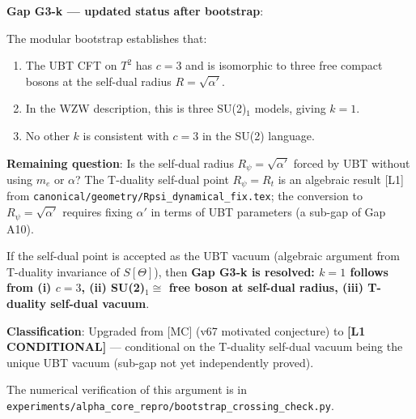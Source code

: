 \documentclass[12pt,a4paper]{article}
\theoremstyle{definition}
\theoremstyle{remark}
\begin{document}
\begin{gapbox}
\textbf{Gap G3-k — updated status after bootstrap}:

The modular bootstrap establishes that:
\begin{enumerate}
  \item The UBT CFT on $T^2$ has $c = 3$ and is isomorphic to three
        free compact bosons at the self-dual radius $R = \sqrt{\alpha'}$.
  \item In the WZW description, this is three SU(2)$_1$ models, giving $k = 1$.
  \item No other $k$ is consistent with $c = 3$ in the SU(2) language.
\end{enumerate}

\textbf{Remaining question}: Is the self-dual radius $R_\psi = \sqrt{\alpha'}$
forced by UBT without using $m_e$ or $\alpha$?  The T-duality self-dual point
$R_\psi = R_t$ is an algebraic result [L1] from
\texttt{canonical/geometry/Rpsi\_dynamical\_fix.tex}; the conversion to
$R_\psi = \sqrt{\alpha'}$ requires fixing $\alpha'$ in terms of UBT parameters
(a sub-gap of Gap A10).

If the self-dual point is accepted as the UBT vacuum (algebraic argument from
T-duality invariance of $S[\Theta]$), then \textbf{Gap G3-k is resolved:
$k = 1$ follows from (i) $c = 3$, (ii) SU(2)$_1 \cong$ free boson at self-dual
radius, (iii) T-duality self-dual vacuum}.

\textbf{Classification}: Upgraded from [MC] (v67 motivated conjecture) to
\textbf{[L1 CONDITIONAL]} — conditional on the T-duality self-dual vacuum being
the unique UBT vacuum (sub-gap not yet independently proved).
\end{gapbox}

\medskip
The numerical verification of this argument is in
\texttt{experiments/alpha\_core\_repro/bootstrap\_crossing\_check.py}.

\ifdefined\INCLUDEMODE
\else
  
\end{document}
